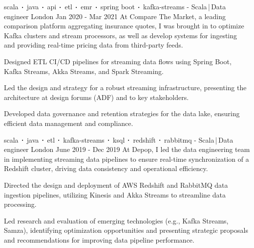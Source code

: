 \begin{cventries}
    \cventry
    {scala$\sqbig$java$\sqbig$api$\sqbig$etl$\sqbig$emr$\sqbig$spring boot$\sqbig$kafka-streams}
    { - Scala\,|\,Data engineer}
    {London}
    {Jan 2020 - Mar 2021}
    {At Compare The Market, a leading comparison platform aggregating insurance quotes, I was brought in to optimize Kafka clusters and stream processors, as well as develop systems for ingesting and providing real-time pricing data from third-party feeds.}
    {
        \begin{cvitems}
            \item{Designed ETL CI/CD pipelines for streaming data flows using Spring Boot, Kafka Streams, Akka Streams, and Spark Streaming.}
            \item{Led the design and strategy for a robust streaming infrastructure, presenting the architecture at design forums (ADF) and to key stakeholders.}
            \item{Developed data governance and retention strategies for the data lake, ensuring efficient data management and compliance.}
        \end{cvitems}
    }

    \cventry
    {scala$\sqbig$java$\sqbig$etl$\sqbig$kafka-streams$\sqbig$ksql$\sqbig$redshift$\sqbig$rabbitmq}
    { - Scala\,|\,Data engineer}
    {London}
    {June 2019 - Dec 2019}
    {At Depop, I led the data engineering team in implementing streaming data pipelines to ensure real-time synchronization of a Redshift cluster, driving data consistency and operational efficiency.}
    {
        \begin{cvitems}
            \item{Directed the design and deployment of AWS Redshift and RabbitMQ data ingestion pipelines, utilizing Kinesis and Akka Streams to streamline data processing.}
            \item{Led research and evaluation of emerging technologies (e.g., Kafka Streams, Samza), identifying optimization opportunities and presenting strategic proposals and recommendations for improving data pipeline performance.}
        \end{cvitems}
    }


\end{cventries}
